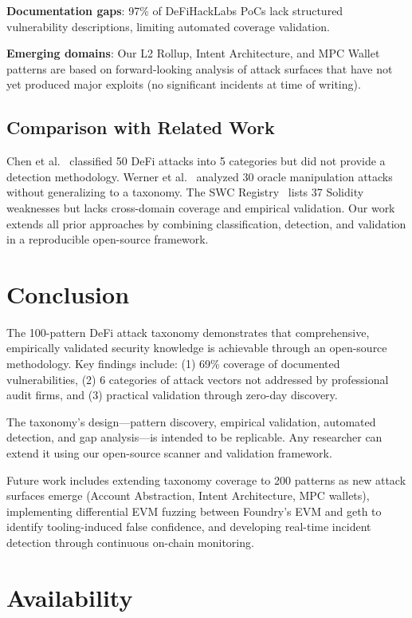 \documentclass[runningheads]{llncs}
\begin{document}
\textbf{Documentation gaps}: 97\% of DeFiHackLabs PoCs lack structured vulnerability descriptions, limiting automated coverage validation.

\textbf{Emerging domains}: Our L2 Rollup, Intent Architecture, and MPC Wallet patterns are based on forward-looking analysis of attack surfaces that have not yet produced major exploits (no significant incidents at time of writing).

\subsection{Comparison with Related Work}

Chen et al.~\cite{chen2023} classified 50 DeFi attacks into 5 categories but did not provide a detection methodology. Werner et al.~\cite{werner2022} analyzed 30 oracle manipulation attacks without generalizing to a taxonomy. The SWC Registry~\cite{swc} lists 37 Solidity weaknesses but lacks cross-domain coverage and empirical validation. Our work extends all prior approaches by combining classification, detection, and validation in a reproducible open-source framework.

\section{Conclusion}

The 100-pattern DeFi attack taxonomy demonstrates that comprehensive, empirically validated security knowledge is achievable through an open-source methodology. Key findings include: (1) 69\% coverage of documented vulnerabilities, (2) 6 categories of attack vectors not addressed by professional audit firms, and (3) practical validation through zero-day discovery.

The taxonomy's design—pattern discovery, empirical validation, automated detection, and gap analysis—is intended to be replicable. Any researcher can extend it using our open-source scanner and validation framework.

Future work includes extending taxonomy coverage to 200 patterns as new attack surfaces emerge (Account Abstraction, Intent Architecture, MPC wallets), implementing differential EVM fuzzing between Foundry's EVM and geth to identify tooling-induced false confidence, and developing real-time incident detection through continuous on-chain monitoring.

\section*{Availability}
\end{document}
